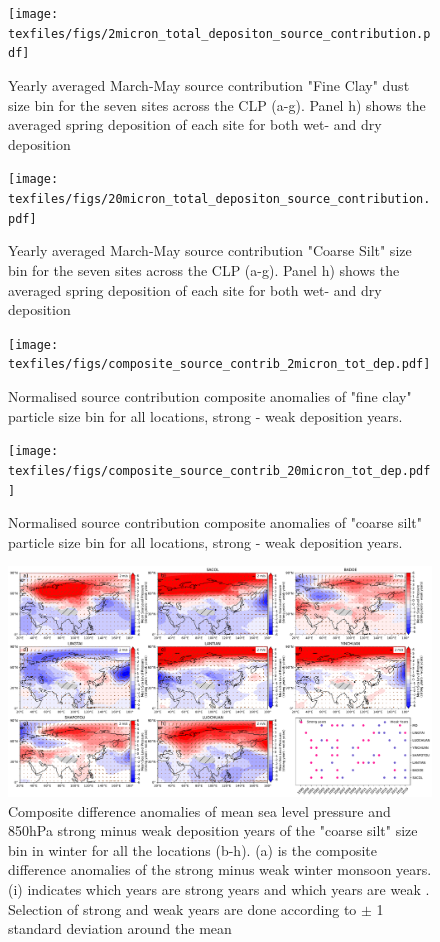\begin{figure}
    \centering
    \texttt{[image: texfiles/figs/2micron\_total\_depositon\_source\_contribution.pdf]}
    \caption{Yearly averaged March-May source contribution "Fine Clay" dust size bin for the seven sites across the CLP (a-g). Panel h) shows the averaged spring deposition of each site for both wet- and dry deposition}
    \label{fig:source_contrib_2mmu}
\end{figure}

\begin{figure}
    \centering
    \texttt{[image: texfiles/figs/20micron\_total\_depositon\_source\_contribution.pdf]}
    \caption{Yearly averaged March-May source contribution "Coarse Silt" size bin for the seven sites across the CLP (a-g). Panel h) shows the averaged spring deposition of each site for both wet- and dry deposition}
    \label{fig:source_contrib_20mmu}
\end{figure}

\begin{figure}[hptb]
    \centering
    \texttt{[image: texfiles/figs/composite\_source\_contrib\_2micron\_tot\_dep.pdf]}
    \caption{Normalised source contribution composite anomalies of "fine clay" particle size bin for all locations, strong - weak deposition years.}
    \label{fig:source_contrib2mmu_anomalies}
\end{figure}

\begin{figure}[hptb]
    \centering
    \texttt{[image: texfiles/figs/composite\_source\_contrib\_20micron\_tot\_dep.pdf]}
    \caption{Normalised source contribution composite anomalies of "coarse silt" particle size bin for all locations, strong - weak deposition years.}
    \label{fig:source_contrib20mmu_anomalies}
\end{figure}

\begin{figure}
    \centering
    \includegraphics[width=\columnwidth]{texfiles/figs/mslp_850hPa_20micron_DJF.pdf}
    \caption{Composite difference anomalies of mean sea level pressure and 850hPa strong minus weak deposition years of the "coarse silt" size bin in winter for all the locations (b-h). (a) is the composite difference anomalies of the strong minus weak winter monsoon years. (i) indicates which years are strong years and which years are weak . Selection of strong and weak years are done according to $\pm$ 1 standard deviation around the mean}
    \label{fig:DJF_850_coarse_composite}
\end{figure}

